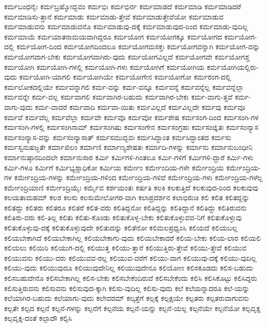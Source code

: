 {ಕರ್ಮಬಂಧನೈಃ
ಕರ್ಮಬ್ರಹ್ಮೋದ್ಭವಂ
ಕರ್ಮಭಿಃ
ಕರ್ಮಭಿರ್ನ
ಕರ್ಮಮಾಡದೆ
ಕರ್ಮಮಾಡಿ
ಕರ್ಮಮಾಡಿದರೆ
ಕರ್ಮಮಾಡಿಸು-ತ್ತಾನೆ
ಕರ್ಮಮಾಡು
ಕರ್ಮಮಾಡು-ತ್ತೇವೆ
ಕರ್ಮಮಾಡುತ್ತೇವೆಯೋ
ಕರ್ಮಮಾಡುವ
ಕರ್ಮಮಾಡುವನು
ಕರ್ಮಮಾಡುವನೊ
ಕರ್ಮಮಾಡುವು-ದಕ್ಕೆ
ಕರ್ಮಮಾಡುವುದ-ರಿಂದ
ಕರ್ಮಮಾಡು-ವುದಿಲ್ಲ
ಕರ್ಮಮಾಯೆ
ಕರ್ಮಯಾತನಾಮಯವಾಗಿದ್ದರೂ
ಕರ್ಮಯೋಗ
ಕರ್ಮಯೋಗಕ್ಕೂ
ಕರ್ಮಯೋಗದ
ಕರ್ಮಯೋಗ-ದಲ್ಲಿ
ಕರ್ಮಯೋಗ-ದಿಂದ
ಕರ್ಮಯೋಗದಿಂದಲೂ
ಕರ್ಮಯೋಗಮಸಕ್ತಃ
ಕರ್ಮಯೋಗವನ್ನಾಗಿ
ಕರ್ಮಯೋಗ-ವನ್ನು
ಕರ್ಮಯೋಗವಾಗ-ಬೇಕು
ಕರ್ಮಯೋಗವಾಗಿರು-ವುದು
ಕರ್ಮಯೋಗವಿಲ್ಲದೆ
ಕರ್ಮಯೋಗವೇ
ಕರ್ಮಯೋಗಶ್ಚ
ಕರ್ಮಯೋಗಿ
ಕರ್ಮಯೋಗಿ-ಗಳಲ್ಲಿ
ಕರ್ಮಯೋಗಿ-ಗಳು
ಕರ್ಮಯೋಗಿಗೆ
ಕರ್ಮಯೋಗಿಯ
ಕರ್ಮಯೋಗಿಯಲ್ಲಿರು-ವುದು
ಕರ್ಮಯೋಗಿ-ಯಾಗಲಿ
ಕರ್ಮಯೋಗಿಯೇ
ಕರ್ಮಯೋಗೇನ
ಕರ್ಮಯೋಗೋ
ಕರ್ಮರಂಗ-ದಲ್ಲಿ
ಕರ್ಮಲೋಕದಲ್ಲಿಯೇ
ಕರ್ಮವನ್ನಾಗಲಿ
ಕರ್ಮ-ವನ್ನು
ಕರ್ಮ-ವನ್ನೂ
ಕರ್ಮವನ್ನೆ
ಕರ್ಮವನ್ನೆಲ್ಲ
ಕರ್ಮವನ್ನೆಲ್ಲಾ
ಕರ್ಮವನ್ನೇ
ಕರ್ಮ-ವಲ್ಲ
ಕರ್ಮವಾಗಲಿ
ಕರ್ಮವಾಗಿರ-ಬಹುದು
ಕರ್ಮವಾಗಿರ-ಬೇಕು
ಕರ್ಮ-ವಾಗು-ತ್ತವೆ
ಕರ್ಮ-ವಾಗು-ವುದು
ಕರ್ಮ-ವಾದರೆ
ಕರ್ಮವಾದಿ
ಕರ್ಮವಾ-ಯಿತು
ಕರ್ಮವಿಲ್ಲದೆ
ಕರ್ಮವಿಲ್ಲದೇ
ಕರ್ಮವು
ಕರ್ಮವೂ
ಕರ್ಮವೆ
ಕರ್ಮವೆಲ್ಲ
ಕರ್ಮವೆಲ್ಲಾ
ಕರ್ಮವೇ
ಕರ್ಮವೊ
ಕರ್ಮವೋ
ಕರ್ಮಶೇಷ
ಕರ್ಮಸಂಗ-ದಿಂದ
ಕರ್ಮಸಂಗಿ-ಗಳ
ಕರ್ಮಸಂಗಿ-ಗಳಲ್ಲಿ
ಕರ್ಮಸಂಗಿನಾಮ್
ಕರ್ಮಸಂಗಿಷು
ಕರ್ಮಸಂಗೇನ
ಕರ್ಮಸಂಗ್ರಹಃ
ಕರ್ಮಸಂಜ್ಞಿತಃ
ಕರ್ಮಸಂನ್ಯಾಸ
ಕರ್ಮಸಂನ್ಯಾಸ-ವನ್ನು
ಕರ್ಮಸಂನ್ಯಾಸಾತ್
ಕರ್ಮಸಮುದ್ಭವಃ
ಕರ್ಮಸಿದ್ಧಾಂತ
ಕರ್ಮಸಿದ್ಧಾಂತದ
ಕರ್ಮಸು
ಕರ್ಮಸ್ವನುಷಜ್ಜತೇ
ಕರ್ಮಾಖಿಲಂ
ಕರ್ಮಾಣಿ
ಕರ್ಮಾಣ್ಯಶೇಷತಃ
ಕರ್ಮಾದಿ-ಗಳನ್ನು
ಕರ್ಮಾನು
ಕರ್ಮಾನುಬಂಧೀನಿ
ಕರ್ಮಾನುಷ್ಠಾನದಿಂದಲೇ
ಕರ್ಮಾನುಸಾರ
ಕರ್ಮಿ
ಕರ್ಮಿಗಳಿ-ಗಿಂತಲೂ
ಕರ್ಮಿ-ಗಳಿಗೆ
ಕರ್ಮಿಗಳಿ-ದ್ದಾರೆ
ಕರ್ಮಿ-ಗಳು
ಕರ್ಮಿ-ಗಳೂ
ಕರ್ಮಿಗೆ
ಕರ್ಮಿಭ್ಯಶ್ಚಾಧಿಕೋ
ಕರ್ಮಿಯ
ಕರ್ಮೇಂ
ಕರ್ಮೇಂದಿಯ-ಗಳೇ
ಕರ್ಮೇಂದ್ರಿಯ
ಕರ್ಮೇಂದ್ರಿಯ-ಗಳ
ಕರ್ಮೇಂದ್ರಿಯ-ಗಳನ್ನು
ಕರ್ಮೇಂದ್ರಿಯ-ಗಳಿಂದ
ಕರ್ಮೇಂದ್ರಿಯ-ಗಳಿವೆ
ಕರ್ಮೇಂದ್ರಿಯ-ಗಳು
ಕರ್ಮೇಂದ್ರಿಯ-ಗಳೆಲ್ಲ
ಕರ್ಮೇಂದ್ರಿಯಾಣಿ
ಕರ್ಮೇಂದ್ರಿಯೈಃ
ಕರ್ಮೈವ
ಕರ್ಶಯಂತಃ
ಕರ್ಷತಿ
ಕಲಕಿ
ಕಲಕುತ್ತಿದೆ
ಕಲಕುವುದ-ರಿಂದ
ಕಲಕುವುವು
ಕಲಯತಾಮಹಮ್
ಕಲಶ
ಕಲಸು
ಕಲಸುಮೇಲೋಗರ-ವಾಗಿ
ಕಲಾಪ್ರದರ್ಶನ
ಕಲಾಭಿರುಚಿ
ಕಲಿ
ಕಲಿತ
ಕಲಿತದ್ದನ್ನು
ಕಲಿತದ್ದು
ಕಲಿತರು
ಕಲಿತರೂ
ಕಲಿತರೆ
ಕಲಿತ-ವರು
ಕಲಿತಿದ್ದನೋ
ಕಲಿತಿದ್ದನ್ನು
ಕಲಿತಿದ್ದಾನೆ
ಕಲಿತಿದ್ದು
ಕಲಿತಿರುವನು
ಕಲಿತಿರು-ವರು
ಕಲಿ-ತಿಲ್ಲ
ಕಲಿತು
ಕಲಿತು-ಕೊಂಡು
ಕಲಿತುಕೊಳ್ಳ-ಬೇಕು
ಕಲಿತುಕೊಳ್ಳುವವ-ನಿಗೆ
ಕಲಿತುಕೊಳ್ಳುವು
ಕಲಿತುಕೊಳ್ಳುವು-ದಕ್ಕೆ
ಕಲಿತುಕೊಳ್ಳುವುದೇ
ಕಲಿತುದನ್ನು
ಕಲಿತೆನೋ
ಕಲಿಮಲಪ್ರಧ್ವಂಸಿ
ಕಲಿಯದೆ
ಕಲಿಯಬಲ್ಲ
ಕಲಿಯಬೇಕಾಗಿದೆ
ಕಲಿಯಬೇಕಾಗಿಲ್ಲ
ಕಲಿಯಬೇಕಾಗು-ವುದು
ಕಲಿಯಬೇಕಾದರೆ
ಕಲಿಯ-ಬೇಕು
ಕಲಿಯ-ಲಾರ
ಕಲಿಯಲಿ
ಕಲಿಯಲು
ಕಲಿಯಿರಿ
ಕಲಿಯುಗ-ದಲ್ಲಿ
ಕಲಿಯುತ್ತ
ಕಲಿಯು-ತ್ತಾನೆ
ಕಲಿಯುತ್ತಿರು-ತ್ತೇವೆ
ಕಲಿಯು-ತ್ತೇವೆ
ಕಲಿಯುವ
ಕಲಿಯುವನು
ಕಲಿಯು-ವರು
ಕಲಿಯುವವ-ರಲ್ಲ
ಕಲಿಯುವ-ವರೆಗೆ
ಕಲಿಯು-ವಾಗ
ಕಲಿಯುವು-ದಕ್ಕೆ
ಕಲಿಯು-ವುದಿಲ್ಲ
ಕಲಿಯು-ವುದು
ಕಲಿಯುವುದೂ
ಕಲಿಯುವುದೇನಿಲ್ಲ
ಕಲಿಯುವುದೇನೂ
ಕಲಿಯೋಣ
ಕಲಿಸಕೂಡದು
ಕಲಿಸ-ಬಹುದು
ಕಲಿಸಬಹುದೇನೊ
ಕಲಿಸಬೇಕಾಗಿಲ್ಲ
ಕಲಿಸ-ಬೇಕು
ಕಲಿಸಬೇಕೆಂದಿರುವೆ
ಕಲಿಸಬೇಕೆಂದು
ಕಲಿಸಿ
ಕಲಿಸಿಕೊಟ್ಟು
ಕಲಿಸಿದ್ದರು
ಕಲಿಸುತ್ತಿರುವನು
ಕಲಿಸುವನು
ಕಲಿಸುವುದ-ಕ್ಕಾಗಿ
ಕಲಿಸು-ವುದಿಲ್ಲ
ಕಲಿಸು-ವುದು
ಕಲೆ
ಕಲೆಯನ್ನಾದರೂ
ಕಲೆ-ಯನ್ನು
ಕಲೆಯಾಗಿರ-ಬಹುದು
ಕಲೆಯಾಗು-ವುದು
ಕಲೇವರಮ್
ಕಲ್ಕತ್ತೆಗೆ
ಕಲ್ಪಕ್ಕೆ
ಕಲ್ಪಕ್ಷಯೇ
ಕಲ್ಪತರು
ಕಲ್ಪತರುವಾಗುವನು
ಕಲ್ಪತೇ
ಕಲ್ಪದ
ಕಲ್ಪನೆ
ಕಲ್ಪನೆ-ಗಳನ್ನು
ಕಲ್ಪನೆಗೆ
ಕಲ್ಪನೆಯ
ಕಲ್ಪನೆ-ಯನ್ನು
ಕಲ್ಪನೆ-ಯಲ್ಲ
ಕಲ್ಪನೆಯೇ
ಕಲ್ಪನೆಯೋ
ಕಲ್ಪವೃಕ್ಷ
ಕಲ್ಪವೃಕ್ಷ-ದಂತೆ
ಕಲ್ಪಾದೌ
ಕಲ್ಪಿಸಿ
}
